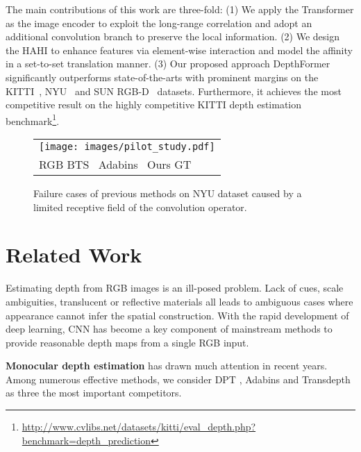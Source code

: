 \documentclass[twocolumn]{svjour3}    \pdfoutput=1
\begin{document}
The main contributions of this work are three-fold: (1) We apply the Transformer as the image encoder to exploit the long-range correlation and adopt an additional convolution branch to preserve the local information. (2) We design the HAHI to enhance features via element-wise interaction and model the affinity in a set-to-set translation manner. (3) Our proposed approach DepthFormer significantly outperforms state-of-the-arts with prominent margins on the KITTI~\citep{geiger2013kitti}, NYU~\citep{silberman2012nyu} and SUN RGB-D~\citep{song2015sun} datasets. Furthermore, it achieves the most competitive result on the highly competitive KITTI depth estimation benchmark\footnote{\url{http://www.cvlibs.net/datasets/kitti/eval_depth.php?benchmark=depth_prediction}}.


\begin{figure*}[t]
    \centering
    \footnotesize
    \begin{tabular}{l}
        \texttt{[image: images/pilot\_study.pdf]} \\
        \hspace{0.08\linewidth}RGB
        \hspace{0.09\linewidth}BTS~\citep{lee2019bts}
        \hspace{0.02\linewidth}Adabins~\citep{bhat2021adabins}
        \hspace{0.07\linewidth}Ours
        \hspace{0.16\linewidth}GT\\
    \end{tabular}
    \caption{Failure cases of previous methods on NYU dataset caused by a limited receptive field of the convolution operator.}
    \label{fig:pilot-study-sota}
 \end{figure*}

\section{Related Work}
\label{sec:related_work}

Estimating depth from RGB images is an ill-posed problem. Lack of cues, scale ambiguities, translucent or reflective materials all leads to ambiguous cases where appearance cannot infer the spatial construction. With the rapid development of deep learning, CNN has become a key component of mainstream methods to provide reasonable depth maps from a single RGB input.

\textbf{Monocular depth estimation} has drawn much attention in recent years. Among  numerous effective methods, we consider DPT \citep{ranftl2021dpt}, Adabins \citep{bhat2021adabins} and Transdepth \citep{yang2021transdepth} as three the most important competitors.
\end{document}
